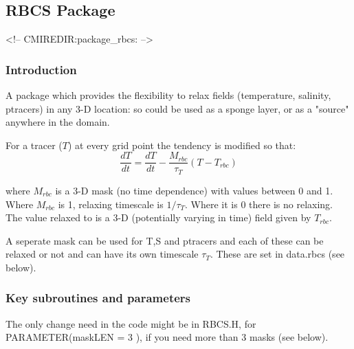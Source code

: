 \subsection {RBCS Package} 
\label{sec:pkg:rbcs}
\begin{rawhtml}
<!-- CMIREDIR:package_rbcs: -->
\end{rawhtml}

\subsubsection {Introduction}

A package which provides the flexibility
to relax fields (temperature, salinity, ptracers)
in any 3-D location:
so could be used as a sponge layer, or as a
"source" anywhere in the domain.

\noindent
For a tracer ($T$) at every grid point the tendency is modified so that:
\[
\frac{dT}{dt}=\frac{dT}{dt} - \frac{M_{rbc}}{\tau_T} (T-T_{rbc})
\]

\noindent
where $M_{rbc}$ is a 3-D mask (no time dependence) with
values between 0 and 1. Where $M_{rbc}$ is 1, relaxing timescale
is $1/\tau_T$. Where it is 0 there is no relaxing.
The value relaxed to is a 3-D (potentially varying in
time) field given by $T_{rbc}$. 

A seperate mask can be used for T,S and ptracers and
each of these
can be relaxed or not and can have its own timescale
$\tau_T$. These are set in data.rbcs (see below).

\subsubsection {Key subroutines and parameters}

The only change need in the code might be in {RBCS.H}, for
PARAMETER(maskLEN = 3 ), if you need more than 3
masks (see below).

\vspace{.5cm}

